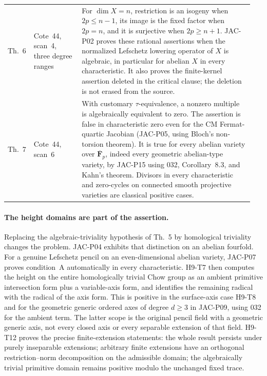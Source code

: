 \documentclass[11pt,a4paper]{article}
\begin{document}
\begin{longtable}{@{}p{0.08\linewidth}p{0.19\linewidth}p{0.68\linewidth}@{}}
Th.~6 & Cote~44, scan~4, three degree ranges &
For $\dim X=n$, restriction is an isogeny when $2p\le n-1$,
its image is the fixed factor when $2p=n$, and it is surjective
when $2p\ge n+1$. JAC-P02 proves these rational assertions when
the normalized Lefschetz lowering operator of $X$ is algebraic,
in particular for abelian $X$ in every characteristic. It also
proves the finite-kernel assertion deleted in the critical clause;
the deletion is not erased from the source.\\

Th.~7 & Cote~44, scan~6 &
With customary $\tau$-equivalence, a nonzero multiple is
algebraically equivalent to zero. The assertion is false in
characteristic zero even for the CM Fermat-quartic Jacobian
(JAC-P05, using Bloch's non-torsion theorem).
It is true for every abelian variety over $\overline{\mathbf F}_p$,
indeed every geometric abelian-type variety, by JAC-P15 using
032, Corollary~8.3, and Kahn's theorem. Divisors in every
characteristic and zero-cycles on connected smooth projective
varieties are classical positive cases.\\
\bottomrule
\end{longtable}
\endgroup

\paragraph{The height domains are part of the assertion.}
Replacing the algebraic-triviality hypothesis of Th.~5 by
homological triviality changes the problem. JAC-P04 exhibits that
distinction on an abelian fourfold. For a genuine Lefschetz pencil
on an even-dimensional abelian variety, JAC-P07 proves condition~A
automatically in every characteristic. H9-T7 then computes the
height on the entire homologically trivial Chow group as an
ambient primitive intersection form plus a variable-axis form,
and identifies the remaining radical with the radical of the axis
form. This is positive in the surface-axis case
H9-T8 and for the geometric generic ordered axes of degree
$d\ge3$ in JAC-P09, using 032 for the ambient term. The latter
scope is the original pencil field with a geometric generic axis,
not every closed axis or every separable extension of that field.
H9-T12 proves the precise finite-extension statements: the whole
result persists under purely inseparable extensions; arbitrary
finite extensions have an orthogonal restriction--norm
decomposition on the admissible domain; the algebraically trivial
primitive domain remains positive modulo the unchanged fixed trace.
\end{document}
